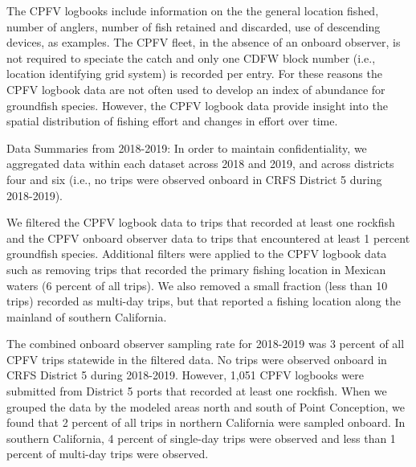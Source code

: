 \documentclass[11pt,
  letterpaper,
]{article}
\begin{document}
The CPFV logbooks include information on the the general location fished, number of anglers, number of fish retained and discarded, use of descending devices, as examples. The CPFV fleet, in the absence of an onboard observer, is not required to speciate the catch and only one CDFW block number (i.e., location identifying grid system) is recorded per entry. For these reasons the CPFV logbook data are not often used to develop an index of abundance for groundfish species. However, the CPFV logbook data provide insight into the spatial distribution of fishing effort and changes in effort over time.

Data Summaries from 2018-2019: In order to maintain confidentiality, we aggregated data within each dataset across 2018 and 2019, and across districts four and six (i.e., no trips were observed onboard in CRFS District 5 during 2018-2019).

We filtered the CPFV logbook data to trips that recorded at least one rockfish and the CPFV onboard observer data to trips that encountered at least 1 percent groundfish species. Additional filters were applied to the CPFV logbook data such as removing trips that recorded the primary fishing location in Mexican waters (6 percent of all trips). We also removed a small fraction (less than 10 trips) recorded as multi-day trips, but that reported a fishing location along the mainland of southern California.

The combined onboard observer sampling rate for 2018-2019 was 3 percent of all CPFV trips statewide in the filtered data. No trips were observed onboard in CRFS District 5 during 2018-2019. However, 1,051 CPFV logbooks were submitted from District 5 ports that recorded at least one rockfish. When we grouped the data by the modeled areas north and south of Point Conception, we found that 2 percent of all trips in northern California were sampled onboard. In southern California, 4 percent of single-day trips were observed and less than 1 percent of multi-day trips were observed.
\end{document}
